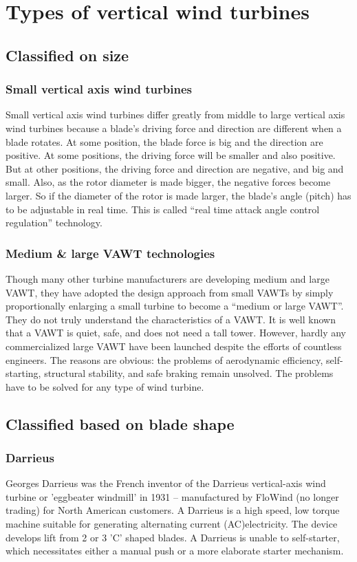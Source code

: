 \documentclass[12pt,a4paper]{article}
\begin{document}
\newpage
\section{Types of vertical wind turbines}
\subsection{Classified on size}
\subsubsection{Small vertical axis wind turbines}
Small vertical axis wind turbines differ greatly from middle to large vertical axis wind turbines because a blade’s driving force and direction are different when a blade rotates. At some position, the blade force is big and the direction are positive. At some positions, the driving force will be smaller and also positive. But at other positions, the driving force and direction are negative, and big and small. Also, as the rotor diameter is made bigger, the negative forces become larger. So if the diameter of the rotor is made larger, the blade’s angle (pitch) has to be adjustable in real time. This is called “real time attack angle control regulation” technology.
\subsubsection{Medium \& large VAWT technologies}
Though many other turbine manufacturers are developing medium and large VAWT, they have adopted the design approach from small VAWTs by simply proportionally enlarging a small turbine to become a “medium or large VAWT”. They do not truly understand the characteristics of a VAWT.
It is well known that a VAWT is quiet, safe, and does not need a tall tower. However, hardly any commercialized large VAWT have been launched despite the efforts of countless engineers. The reasons are obvious: the problems of aerodynamic efficiency, self-starting, structural stability, and safe braking remain unsolved. The problems have to be solved for any type of wind turbine.

\subsection{Classified based on blade shape}
\subsubsection{Darrieus}
Georges Darrieus was the French inventor of the Darrieus vertical-axis wind turbine or 'eggbeater windmill' in 1931 – manufactured by FloWind (no longer trading) for North American customers. A Darrieus is a high speed, low torque machine suitable for generating alternating current (AC)electricity. The device develops lift from 2 or 3 'C' shaped blades. A Darrieus is unable to self-starter, which necessitates either a manual push or a more elaborate starter mechanism.
 
\end{document}
